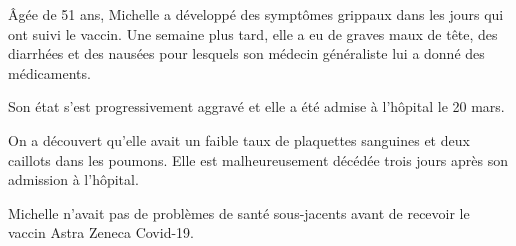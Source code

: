 Âgée de 51 ans, Michelle a développé des symptômes grippaux dans les jours qui
ont suivi le vaccin. Une semaine plus tard, elle a eu de graves maux de tête,
des diarrhées et des nausées pour lesquels son médecin généraliste lui a donné
des médicaments.

Son état s'est progressivement aggravé et elle a été admise à l'hôpital le 20
mars.

On a découvert qu'elle avait un faible taux de plaquettes sanguines et deux
caillots dans les poumons. Elle est malheureusement décédée trois jours après
son admission à l'hôpital.

Michelle n'avait pas de problèmes de santé sous-jacents avant de recevoir le
vaccin Astra Zeneca Covid-19.
